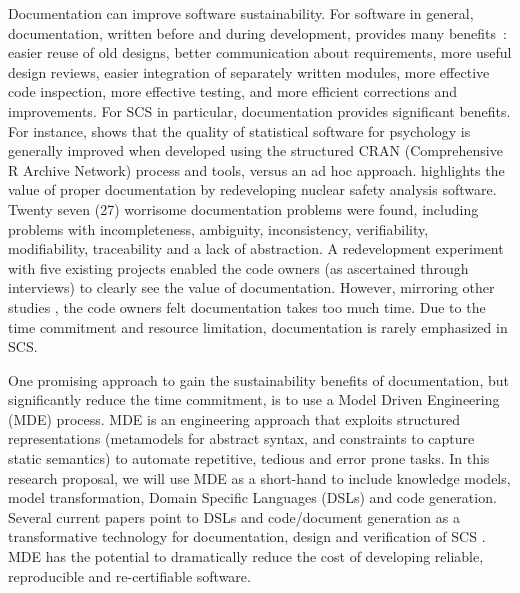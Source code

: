 \documentclass[12pt]{article}
\begin{document}
Documentation can improve software sustainability.  For software in general,
documentation, written before and during development, provides many
benefits~\cite{Parnas2010}: easier reuse of old designs, better communication
about requirements, more useful design reviews, easier integration of separately
written modules, more effective code inspection, more effective testing, and
more efficient corrections and improvements. For SCS in particular,
documentation provides significant benefits.  For instance,
\citet{SmithEtAl2015-SS-TR} shows that the quality of statistical software for
psychology is generally improved when developed using the structured CRAN
(Comprehensive R Archive Network) process and tools, versus an ad hoc approach.
\citet{SmithAndKoothoor2016} highlights the value of proper documentation by
redeveloping nuclear safety analysis software.  Twenty seven (27) worrisome
documentation problems were found, including problems with incompleteness,
ambiguity, inconsistency, verifiability, modifiability, traceability and a lack
of abstraction.  A redevelopment experiment with five existing projects
\citep{SmithJegatheesanAndKelly2016} enabled the code owners (as ascertained
through interviews) to clearly see the value of documentation.  However,
mirroring other studies \citep{CarverEtAl2007}, the code owners felt
documentation takes too much time.  Due to the time commitment and resource
limitation, documentation is rarely emphasized in SCS.

One promising approach to gain the sustainability benefits of documentation, but
significantly reduce the time commitment, is to use a Model Driven Engineering
(MDE) process.  MDE is an engineering approach that exploits structured
representations (metamodels for abstract syntax, and constraints to capture
static semantics) to automate repetitive, tedious and error prone tasks.  In
this research proposal, we will use MDE as a short-hand to include knowledge
models, model transformation, Domain Specific Languages (DSLs) and code
generation.  Several current papers point to DSLs and code/document generation
as a transformative technology for documentation, design and verification of SCS
\citep{JohansonAndHasselbring2018, Smith2018}.  MDE has the potential to
dramatically reduce the cost of developing reliable, reproducible and
re-certifiable software.
\end{document}
